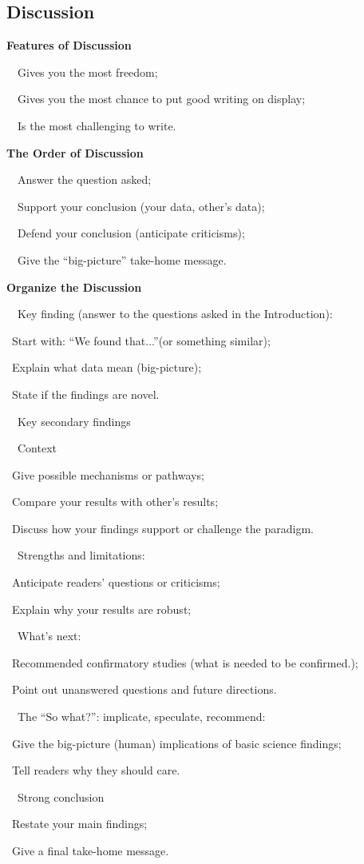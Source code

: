 \documentclass[a4paper, 12pt]{article}
\begin{document}
\newpage\subsection{Discussion}

\textbf{Features of Discussion}
\par\ \textbullet\ Gives you the most freedom;
\par\ \textbullet\ Gives you the most chance to put good writing on display;
\par\ \textbullet\ Is the most challenging to write.

\textbf{The Order of Discussion}
\par\ \textbullet\ Answer the question asked;
\par\ \textbullet\ Support your conclusion (your data, other's data);
\par\ \textbullet\ Defend your conclusion (anticipate criticisms);
\par\ \textbullet\ Give the ``big-picture'' take-home message.

\newpage\textbf{Organize the Discussion}
\par\ \textbullet\ Key finding (answer to the questions asked in the Introduction):
\par\quad\textopenbullet\ Start with: ``We found that...''(or something similar);
\par\quad\textopenbullet\ Explain what data mean (big-picture);
\par\quad\textopenbullet\ State if the findings are novel.
\par\ \textbullet\ Key secondary findings
\par\ \textbullet\ Context
\par\quad\textopenbullet\ Give possible mechanisms or pathways;
\par\quad\textopenbullet\ Compare your results with other's results;
\par\quad\textopenbullet\ Discuss how your findings support or challenge the paradigm.
\par\ \textbullet\ Strengths and limitations:
\par\quad\textopenbullet\ Anticipate readers' questions or criticisms;
\par\quad\textopenbullet\ Explain why your results are robust;
\par\ \textbullet\ What's next:
\par\quad\textopenbullet\ Recommended confirmatory studies (what is needed to be confirmed.);
\par\quad\textopenbullet\ Point out unanswered questions and future directions.
\par\ \textbullet\ The ``So what?'': implicate, speculate, recommend:
\par\quad\textopenbullet\ Give the big-picture (human) implications of basic science findings;
\par\quad\textopenbullet\ Tell readers why they should care.
\par\ \textbullet\ Strong conclusion
\par\quad\textopenbullet\ Restate your main findings;
\par\quad\textopenbullet\ Give a final take-home message.
\end{document}
